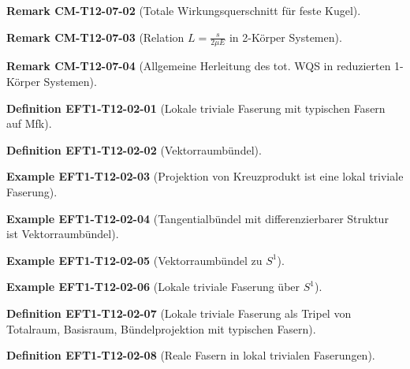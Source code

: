 \documentclass[10pt, letterpaper]{article}
\newcommand{\CustomHeading}[3]{%
  \par\medskip\noindent%
  \textbf{#1 #2} \textnormal{(#3)}.\enskip%
}
\newenvironment{DEF}[2]{\CustomHeading{Definition}{#1}{#2}}{}
\newenvironment{REM}[2]{\CustomHeading{Remark}{#1}{#2}}{}
\newenvironment{EXA}[2]{\CustomHeading{Example}{#1}{#2}}{}
\begin{document}
\begin{REM}{CM-T12-07-02}{Totale Wirkungsquerschnitt für feste Kugel}
\end{REM}

\begin{REM}{CM-T12-07-03}{Relation $L = \frac{s}{2\mu E}$ in 2-Körper Systemen}
\end{REM}

\begin{REM}{CM-T12-07-04}{Allgemeine Herleitung des tot. WQS in reduzierten 1-Körper Systemen}
\end{REM}

\begin{DEF}{EFT1-T12-02-01}{Lokale triviale Faserung mit typischen Fasern auf Mfk}
\end{DEF}

\begin{DEF}{EFT1-T12-02-02}{Vektorraumbündel}
\end{DEF}

\begin{EXA}{EFT1-T12-02-03}{Projektion von Kreuzprodukt ist eine lokal triviale Faserung}
\end{EXA}

\begin{EXA}{EFT1-T12-02-04}{Tangentialbündel mit differenzierbarer Struktur ist Vektorraumbündel}
\end{EXA}

\begin{EXA}{EFT1-T12-02-05}{Vektorraumbündel zu $S^1$}
\end{EXA}

\begin{EXA}{EFT1-T12-02-06}{Lokale triviale Faserung über $S^1$}
\end{EXA}

\begin{DEF}{EFT1-T12-02-07}{Lokale triviale Faserung als Tripel von Totalraum, Basisraum, Bündelprojektion mit typischen Fasern}
\end{DEF}

\begin{DEF}{EFT1-T12-02-08}{Reale Fasern in lokal trivialen Faserungen}
\end{DEF}
\end{document}
